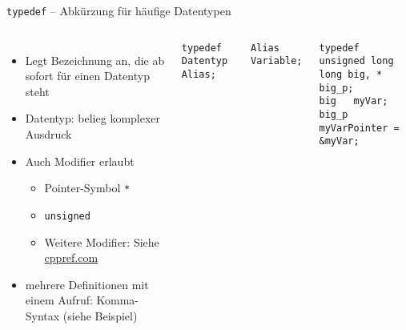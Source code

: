 
\begin{frame}[fragile]{\texttt{typedef} -- Abkürzung für häufige Datentypen}
%
\begin{columns}[T]
\begin{itemize}
\item Legt Bezeichnung an, die ab sofort für einen Datentyp steht
\item Datentyp: belieg komplexer Ausdruck
\item Auch Modifier erlaubt
	\begin{itemize}
	\item Pointer-Symbol \texttt{*}
	\item \texttt{unsigned}
	\item Weitere Modifier: Siehe \href{http://en.cppreference.com/w/c/language/declarations}{cppref.com}
	\end{itemize}
\item mehrere Definitionen mit einem Aufruf: Komma-Syntax (siehe Beispiel)
\end{itemize}
%
\begin{codebox}
\begin{verbatim}
typedef Datentyp Alias;
\end{verbatim}
\end{codebox}
%
\begin{codebox}
\begin{verbatim}
Alias Variable;
\end{verbatim}
\end{codebox}
%
\begin{codebox}[Beispiel]
\begin{verbatim}
typedef unsigned long long big, * big_p;
big   myVar;
big_p myVarPointer = &myVar;
\end{verbatim}
\end{codebox}
%
\end{columns}
%
\end{frame}


